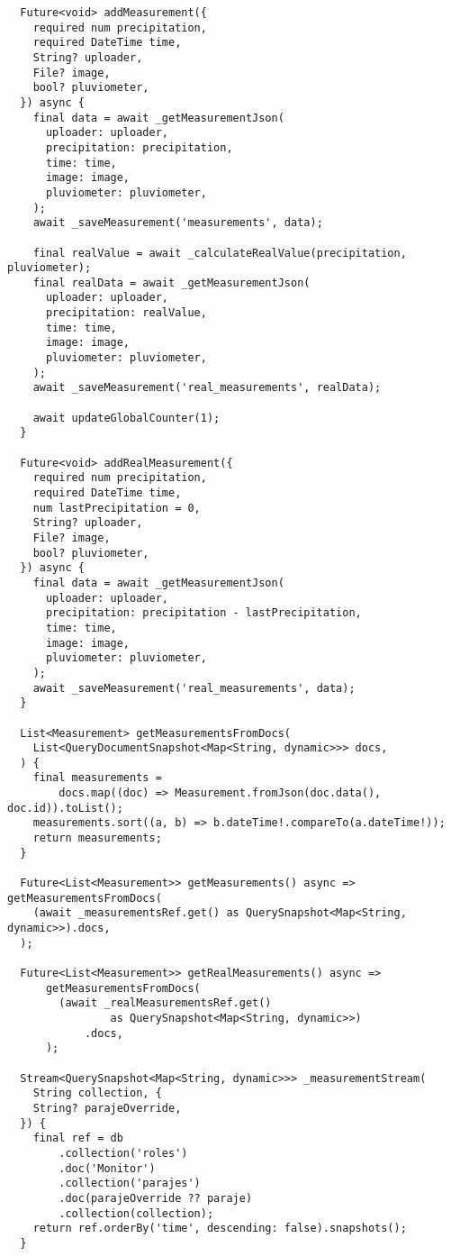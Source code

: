 \begin{verbatim}
  Future<void> addMeasurement({
    required num precipitation,
    required DateTime time,
    String? uploader,
    File? image,
    bool? pluviometer,
  }) async {
    final data = await _getMeasurementJson(
      uploader: uploader,
      precipitation: precipitation,
      time: time,
      image: image,
      pluviometer: pluviometer,
    );
    await _saveMeasurement('measurements', data);

    final realValue = await _calculateRealValue(precipitation, pluviometer);
    final realData = await _getMeasurementJson(
      uploader: uploader,
      precipitation: realValue,
      time: time,
      image: image,
      pluviometer: pluviometer,
    );
    await _saveMeasurement('real_measurements', realData);

    await updateGlobalCounter(1);
  }

  Future<void> addRealMeasurement({
    required num precipitation,
    required DateTime time,
    num lastPrecipitation = 0,
    String? uploader,
    File? image,
    bool? pluviometer,
  }) async {
    final data = await _getMeasurementJson(
      uploader: uploader,
      precipitation: precipitation - lastPrecipitation,
      time: time,
      image: image,
      pluviometer: pluviometer,
    );
    await _saveMeasurement('real_measurements', data);
  }

  List<Measurement> getMeasurementsFromDocs(
    List<QueryDocumentSnapshot<Map<String, dynamic>>> docs,
  ) {
    final measurements =
        docs.map((doc) => Measurement.fromJson(doc.data(), doc.id)).toList();
    measurements.sort((a, b) => b.dateTime!.compareTo(a.dateTime!));
    return measurements;
  }

  Future<List<Measurement>> getMeasurements() async => getMeasurementsFromDocs(
    (await _measurementsRef.get() as QuerySnapshot<Map<String, dynamic>>).docs,
  );

  Future<List<Measurement>> getRealMeasurements() async =>
      getMeasurementsFromDocs(
        (await _realMeasurementsRef.get()
                as QuerySnapshot<Map<String, dynamic>>)
            .docs,
      );

  Stream<QuerySnapshot<Map<String, dynamic>>> _measurementStream(
    String collection, {
    String? parajeOverride,
  }) {
    final ref = db
        .collection('roles')
        .doc('Monitor')
        .collection('parajes')
        .doc(parajeOverride ?? paraje)
        .collection(collection);
    return ref.orderBy('time', descending: false).snapshots();
  }


\end{verbatim}
